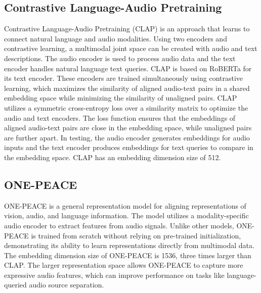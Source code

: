 \documentclass[11pt]{article}
\begin{document}
\subsection{Contrastive Language-Audio Pretraining}
Contrastive Language-Audio Pretraining (CLAP) \cite{clap2022} is an approach that learns to connect natural language and audio modalities. Using two encoders and contrastive learning, a multimodal joint space can be created with audio and text descriptions. The audio encoder is used to process audio data and the text encoder handles natural language text queries. CLAP is based on RoBERTa for its text encoder. These encoders are trained simultaneously using contrastive learning, which maximizes the similarity of aligned audio-text pairs in a shared embedding space while minimizing the similarity of unaligned pairs. CLAP utilizes a symmetric cross-entropy loss over a similarity matrix to optimize the audio and text encoders. The loss function ensures that the embeddings of aligned audio-text pairs are close in the embedding space, while unaligned pairs are further apart. In testing, the audio encoder generates embeddings for audio inputs and the text encoder produces embeddings for text queries to compare in the embedding space. CLAP has an embedding dimension size of 512.

\subsection{ONE-PEACE}
ONE-PEACE \cite{onepeace} is a general representation model for aligning representations of vision, audio, and language information. The model utilizes a modality-specific audio encoder to extract features from audio signals. Unlike other models, ONE-PEACE is trained from scratch without relying on pre-trained initialization, demonstrating its ability to learn representations directly from multimodal data. The embedding dimension size of ONE-PEACE is 1536, three times larger than CLAP. The larger representation space allows ONE-PEACE to capture more expressive audio features, which can improve performance on tasks like language-queried audio source separation.
\end{document}
